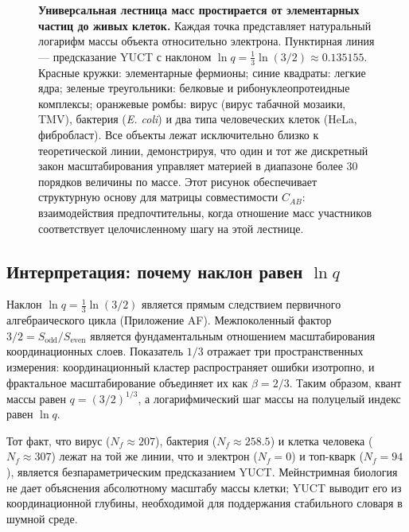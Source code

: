 \documentclass[11pt,a4paper]{article}
\begin{document}
\begin{figure}[H]
		\caption{\textbf{Универсальная лестница масс простирается от элементарных частиц до живых клеток.}
			Каждая точка представляет натуральный логарифм массы объекта относительно электрона.
			Пунктирная линия — предсказание YUCT с наклоном \(\ln q = \frac{1}{3}\ln(3/2) \approx 0.135155\).
			Красные кружки: элементарные фермионы; синие квадраты: легкие ядра; зеленые треугольники: белковые и рибонуклеопротеидные комплексы; оранжевые ромбы: вирус (вирус табачной мозаики, TMV), бактерия (\textit{E. coli}) и два типа человеческих клеток (HeLa, фибробласт).
			Все объекты лежат исключительно близко к теоретической линии, демонстрируя, что один и тот же дискретный закон масштабирования управляет материей в диапазоне более 30 порядков величины по массе.
			Этот рисунок обеспечивает структурную основу для матрицы совместимости \(C_{AB}\): взаимодействия предпочтительны, когда отношение масс участников соответствует целочисленному шагу на этой лестнице.}
		\label{fig:ladder_cells}
	\end{figure}
	
	\subsection{Интерпретация: почему наклон равен \(\ln q\)}
	
	Наклон \(\ln q = \frac{1}{3}\ln(3/2)\) является прямым следствием первичного алгебраического цикла (Приложение AF). Межпоколенный фактор \(3/2 = S_{\mathrm{odd}}/S_{\mathrm{even}}\) является фундаментальным отношением масштабирования координационных слоев. Показатель \(1/3\) отражает три пространственных измерения: координационный кластер распространяет ошибки изотропно, и фрактальное масштабирование объединяет их как \(\beta = 2/3\). Таким образом, квант массы равен \(q = (3/2)^{1/3}\), а логарифмический шаг массы на полуцелый индекс равен \(\ln q\).
	
	Тот факт, что вирус (\(N_f \approx 207\)), бактерия (\(N_f \approx 258.5\)) и клетка человека (\(N_f \approx 307\)) лежат на той же линии, что и электрон (\(N_f = 0\)) и топ-кварк (\(N_f = 94\)), является безпараметрическим предсказанием YUCT. Мейнстримная биология не дает объяснения абсолютному масштабу массы клетки; YUCT выводит его из координационной глубины, необходимой для поддержания стабильного словаря в шумной среде.
	
\end{document}
